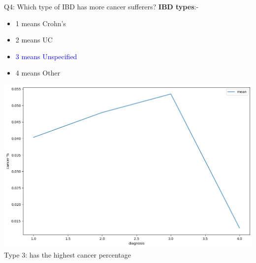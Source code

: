 \documentclass[8pt]{beamer}
\begin{document}
        \begin{frame}{Q4: Which type of IBD has more cancer sufferers?}
            \textbf{IBD types}:-
            \begin{itemize}
                \item 1 means Crohn's
                \item 2 means UC
                \item \textcolor{blue}{3 means Unspecified}
                \item 4 means Other
            \end{itemize}
            \begin{center}
                \includegraphics[height=.55\textheight]{images/cancer.png}\\
                Type 3: has the highest cancer percentage
            \end{center}
        \end{frame}
\end{document}
